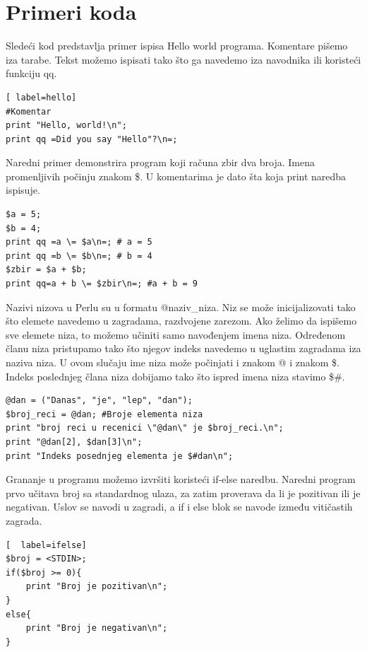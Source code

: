 \documentclass[a4paper]{article}
\begin{document}
\section{Primeri koda}
\label{sec:primeri}

Sledeći kod predstavlja primer ispisa Hello world programa. Komentare pišemo iza tarabe. Tekst možemo ispisati tako što ga navedemo iza navodnika ili koristeći funkciju qq.
\begin{lstlisting}[ label=hello]
#Komentar
print "Hello, world!\n";
print qq =Did you say "Hello"?\n=;
\end{lstlisting}

Naredni primer demonstrira program koji računa zbir dva broja. Imena promenljivih počinju znakom \$. U komentarima je dato šta koja print naredba ispisuje.
\begin{lstlisting}[label = zbir]
$a = 5;
$b = 4;
print qq =a \= $a\n=; # a = 5
print qq =b \= $b\n=; # b = 4
$zbir = $a + $b;
print qq=a + b \= $zbir\n=; #a + b = 9
\end{lstlisting}
Nazivi nizova u Perlu su u formatu @naziv\_niza. Niz se može inicijalizovati tako što elemete navedemo u zagradama, razdvojene zarezom. Ako želimo da ispišemo sve elemete niza, to možemo učiniti samo navođenjem imena niza. Određenom članu niza pristupamo tako što njegov indeks navedemo u uglastim zagradama iza naziva niza. U ovom slučaju ime niza može počinjati i znakom @ i znakom \$. Indeks poslednjeg člana niza dobijamo tako što ispred imena niza stavimo \$\#.
\begin{lstlisting}[label=niz]
@dan = ("Danas", "je", "lep", "dan"); 
$broj_reci = @dan; #Broje elementa niza
print "broj reci u recenici \"@dan\" je $broj_reci.\n";
print "@dan[2], $dan[3]\n";
print "Indeks posednjeg elementa je $#dan\n";
\end{lstlisting}
Grananje u programu možemo izvršiti koristeći if-else naredbu. Naredni program prvo učitava broj sa standardnog ulaza, za zatim proverava da li je pozitivan ili je negativan. Uslov se navodi u zagradi, a if i else blok se navode između vitičastih zagrada.
\begin{lstlisting}[  label=ifelse]
$broj = <STDIN>;
if($broj >= 0){
    print "Broj je pozitivan\n";
}
else{
    print "Broj je negativan\n";
}
\end{lstlisting}
\end{document}

